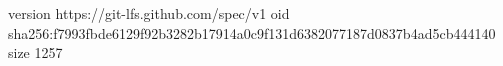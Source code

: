 version https://git-lfs.github.com/spec/v1
oid sha256:f7993fbde6129f92b3282b17914a0c9f131d6382077187d0837b4ad5cb444140
size 1257

